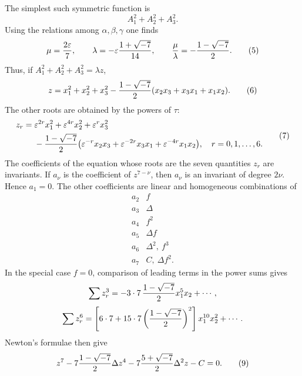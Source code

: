 \documentclass[11pt]{article}
\providecommand{\eps}{\varepsilon}
\providecommand{\eps}{\varepsilon}
\begin{document}
The simplest such symmetric function is
\begin{equation}
A_1^2+A_2^2+A_3^2.
\tag{4}
\end{equation}
Using the relations among \(\alpha,\beta,\gamma\) one finds
\begin{equation}
\mu={2\eps\over7},\qquad
\lambda=-\eps {1+\sqrt{-7}\over14},\qquad {\mu\over\lambda}=-{1-\sqrt{-7}\over2}.
\tag{5}
\end{equation}
Thus, if \(A_1^2+A_2^2+A_3^2=\lambda z\),
\begin{equation}
z=x_1^2+x_2^2+x_3^2-{1-\sqrt{-7}\over2}(x_2x_3+x_3x_1+x_1x_2).
\tag{6}
\end{equation}
The other roots are obtained by the powers of \(\tau\):
\begin{equation}
\begin{aligned}
z_r={}&\eps^{2r}x_1^2+\eps^{4r}x_2^2+\eps^rx_3^2\\
&-{1-\sqrt{-7}\over2}\bigl(\eps^{-r}x_2x_3+\eps^{-2r}x_3x_1+\eps^{-4r}x_1x_2\bigr),\quad r=0,1,\ldots,6.
\end{aligned}
\tag{7}
\end{equation}
The coefficients of the equation whose roots are the seven quantities \(z_r\) are invariants. If \(a_\nu\) is the coefficient of \(z^{7-\nu}\), then \(a_\nu\) is an invariant of degree \(2\nu\). Hence \(a_1=0\). The other coefficients are linear and homogeneous combinations of
\begin{equation}
\begin{array}{c|c}
a_2&f\\
a_3&\Delta\\
a_4&f^2\\
a_5&\Delta f\\
a_6&\Delta^2,\ f^3\\
a_7&C,\ \Delta f^2.
\end{array}
\tag{8}
\end{equation}
In the special case \(f=0\), comparison of leading terms in the power sums gives
\begin{equation}
\sum z_r^3=-3\cdot7\,{1-\sqrt{-7}\over2}x_1^5x_2+\cdots,
\end{equation}
\begin{equation}
\sum z_r^6=\left[6\cdot7+15\cdot7\left({1-\sqrt{-7}\over2}\right)^2\right]x_1^{10}x_2^2+\cdots.
\end{equation}
Newton's formulae then give
\begin{equation}
z^7-7{1-\sqrt{-7}\over2}\Delta z^4-7{5+\sqrt{-7}\over2}\Delta^2z-C=0.
\tag{9}
\end{equation}
\end{document}
